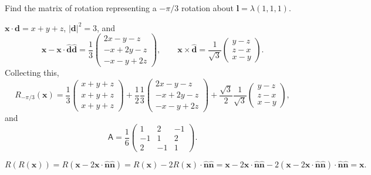 \documentclass[letter-paper]{tufte-book}
\newenvironment{example}[1][Example]{\begin{trivlist}
\item[\hskip \labelsep {\bfseries #1}]}{\end{trivlist}}
\newcommand{\db}{\boldsymbol{d}}
\newcommand{\lb}{\boldsymbol{l}}
\newcommand{\nb}{\boldsymbol{n}}
\newcommand{\xb}{\boldsymbol{x}}
\begin{document}
\begin{example}
	Find the matrix of rotation representing a $-\pi/3$ rotation about
	$\lb=\lambda(1,1,1)$.
	
	$\xb\cdot\db=x+y+z$, $|\db|^2=3$, and
	\begin{equation*}
		\xb-\xb\cdot\hat{\db}\hat{\db}
		=\frac{1}{3}\begin{pmatrix}2x-y-z\\-x+2y-z\\-x-y+2z\end{pmatrix},\qquad
		\xb\times\hat{\db}
		=\frac{1}{\sqrt{3}}\begin{pmatrix}y-z\\z-x\\x-y\end{pmatrix}.
	\end{equation*}
	Collecting this,
	\begin{equation*}
		R_{-\pi/3}(\xb)
		=\frac{1}{3}\begin{pmatrix}x+y+z\\x+y+z\\x+y+z\end{pmatrix}+
		\frac{1}{2}\frac{1}{3}
		\begin{pmatrix}2x-y-z\\-x+2y-z\\-x-y+2z\end{pmatrix}
		+\frac{\sqrt{3}}{2}\frac{1}{\sqrt{3}}
		\begin{pmatrix}y-z\\z-x\\x-y\end{pmatrix},
	\end{equation*}
	and
	\begin{equation*}
		\mathsf{A}=\frac{1}{6}\begin{pmatrix}1 & 2 & -1\\
		-1 & 1 & 2\\2 & -1 & 1\end{pmatrix}.
	\end{equation*}
\end{example}

\begin{example}
	\begin{equation*}
		R(R(\xb))=R(\xb-2\xb\cdot\hat{\nb}\hat{\nb})
		=R(\xb)-2R(\xb)\cdot\hat{\nb}\hat{\nb}
		=\xb-2\xb\cdot\hat{\nb}\hat{\nb}
		-2(\xb-2\xb\cdot\hat{\nb}\hat{\nb})\cdot\hat{\nb}\hat{\nb}
		=\xb.
	\end{equation*}
\end{example}
\end{document}
